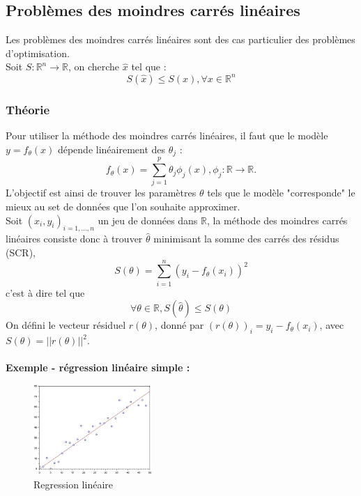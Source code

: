       \subsection{Problèmes des moindres carrés linéaires}
      Les problèmes des moindres carrés linéaires sont des cas particulier des problèmes d'optimisation.
      \\Soit $S :\mathbb{R}^n \to \mathbb{R}$, on cherche $\hat{x}$ tel que : 
      $$S(\hat{x})\leq S(x), \forall x \in \mathbb{R}^n$$
         \subsubsection{Théorie}
         Pour utiliser la méthode des moindres carrés linéaires, il faut que le modèle $y = f_\theta (x)$ dépende linéairement des $\theta_j$ :
         $$f_\theta (x) = \sum_{j=1}^{p}\theta_j \phi_j(x), \phi_j : \mathbb{R} \to \mathbb{R}.$$
         L'objectif est ainsi de trouver les paramètres $\theta$ tels que le modèle "corresponde" le mieux au set de données que l'on souhaite approximer.
         \\
         Soit $(x_i,y_i)_{i=1,...,n}$ un jeu de données dans $\mathbb{R}$, la méthode des moindres carrés linéaires consiste donc à trouver $\hat{\theta}$ minimisant la somme des carrés des résidus (SCR), 
         $$S(\theta) = \sum^n_{i = 1}(y_i-f_\theta (x_i))^2$$
         c'est à dire tel que
         $$\forall \theta \in \mathbb{R}, S(\hat{\theta}) \leq S(\theta)$$
         On défini le vecteur résiduel $r(\theta)$, donné par $(r(\theta))_i = y_i - f_\theta(x_i)$, avec $S(\theta) = ||r(\theta)||^2.$
         \\\\
         \textbf{Exemple - régression linéaire simple :}
         \begin{figure}[h]
              \centering
              \captionsetup{font=small}
                \includegraphics[width=0.4\textwidth]{images/regression_lineaire.jpg}
              \caption{Regression linéaire}
              \label{fig:reg1}
            \end{figure}
            \\
